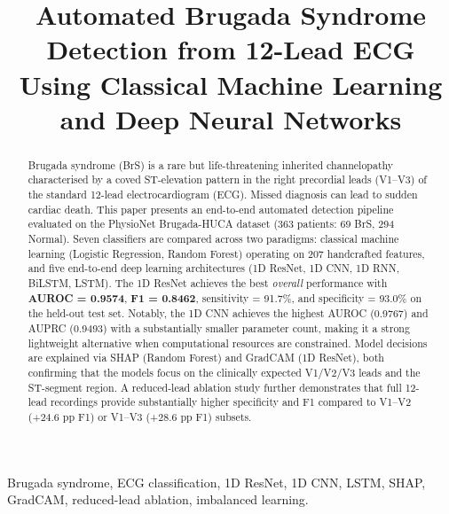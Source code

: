 \documentclass[journal, 10pt, twoside]{IEEEtran}
\begin{document}
\title{Automated Brugada Syndrome Detection from 12-Lead ECG\\
       Using Classical Machine Learning and Deep Neural Networks}

\author{%
}

\maketitle

\begin{abstract}
Brugada syndrome (BrS) is a rare but life-threatening inherited channelopathy
characterised by a coved ST-elevation pattern in the right precordial leads
(V1--V3) of the standard 12-lead electrocardiogram (ECG).
Missed diagnosis can lead to sudden cardiac death.
This paper presents an end-to-end automated detection pipeline evaluated on
the PhysioNet Brugada-HUCA dataset (363 patients: 69 BrS, 294 Normal).
Seven classifiers are compared across two paradigms:
classical machine learning (Logistic Regression, Random Forest) operating
on 207 handcrafted features, and five end-to-end deep learning architectures
(1D ResNet, 1D CNN, 1D RNN, BiLSTM, LSTM).
The 1D ResNet achieves the best \textit{overall} performance with
\textbf{AUROC = 0.9574}, \textbf{F1 = 0.8462},
sensitivity = 91.7\%, and specificity = 93.0\% on the held-out test set.
Notably, the 1D CNN achieves the highest AUROC (0.9767) and AUPRC (0.9493)
with a substantially smaller parameter count, making it a strong
lightweight alternative when computational resources are constrained.
Model decisions are explained via SHAP (Random Forest) and GradCAM
(1D ResNet), both confirming that the models focus on the clinically
expected V1/V2/V3 leads and the ST-segment region.
A reduced-lead ablation study further demonstrates that full 12-lead
recordings provide substantially higher specificity and F1 compared
to V1--V2 (+24.6 pp F1) or V1--V3 (+28.6 pp F1) subsets.
\end{abstract}

\begin{IEEEkeywords}
Brugada syndrome, ECG classification, 1D ResNet, 1D CNN, LSTM,
SHAP, GradCAM, reduced-lead ablation, imbalanced learning.
\end{IEEEkeywords}
\end{document}
